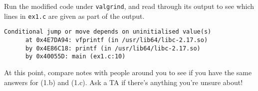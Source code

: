 \begin{part}
  Run the modified code under \lstinline'valgrind', and read through
  its output to see which lines in \lstinline'ex1.c' are given as part
  of the output.

\begin{solution}
\begin{lstlisting}[language={[coin]C}]
Conditional jump or move depends on uninitialised value(s)
      at 0x4E7DA94: vfprintf (in /usr/lib64/libc-2.17.so)
      by 0x4E86C18: printf (in /usr/lib64/libc-2.17.so)
      by 0x40055D: main (ex1.c:10)
\end{lstlisting}
\end{solution}
\end{part}

At this point, compare notes with people around you to see if you have
the same answers for (1.b) and (1.c).  Ask a TA if there's anything
you're unsure about!

\onePT
\egroup